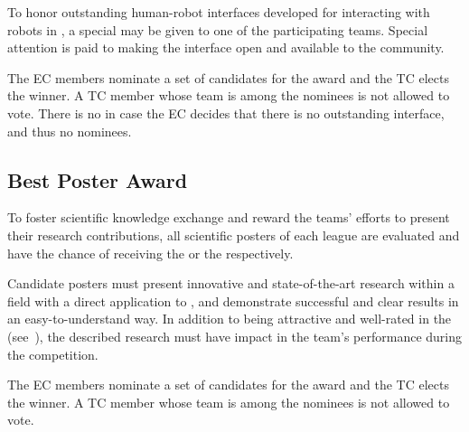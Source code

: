 To honor outstanding human-robot interfaces developed for interacting with robots in \AtHome{}, a special \HRIAward{} may be given to one of the participating teams.
Special attention is paid to making the interface open and available to the \AtHome{} community.

The \AtHome{} EC members nominate a set of candidates for the award and the TC elects the winner.
A TC member whose team is among the nominees is not allowed to vote.
There is no \HRIAward{} in case the EC decides that there is no outstanding interface, and thus no nominees.

\subsection{Best Poster Award}
\label{award:poster}

To foster scientific knowledge exchange and reward the teams' efforts to present their research contributions, all scientific posters of each league are evaluated and have the chance of receiving the \DSPLPosterAward or the \OPLPosterAward respectively.

Candidate posters must present innovative and state-of-the-art research within a field with a direct application to \AtHome, and demonstrate successful and clear results in an easy-to-understand way.
In addition to being attractive and well-rated in the \PS{} (see~), the described research must have impact in the team's performance during the competition.

The \AtHome{} EC members nominate a set of candidates for the award and the TC elects the winner.
A TC member whose team is among the nominees is not allowed to vote.

%
%
%

